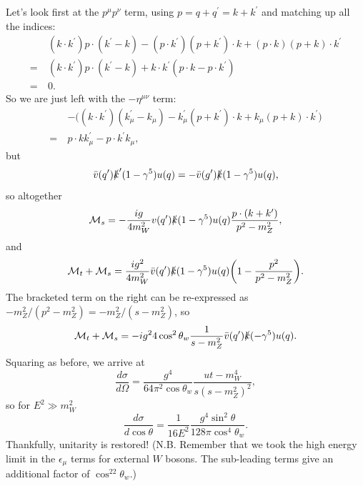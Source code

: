 Let's look first at the $p^\mu p ^\nu$ term, using $p=q+q^\prime = k + k^\prime$ and matching up all the indices:
\begin{equation}
\begin{split}
&(k \cdot k^\prime) p \cdot(k^\prime - k) - (p \cdot k^\prime)(p+k^\prime)\cdot k + (p \cdot k)(p+k) \cdot k^\prime \\
=\ &(k \cdot k^\prime)p\cdot(k^\prime-k) + k\cdot k^\prime (p\cdot k - p \cdot k^\prime) \\
=\ &0.
\end{split}
\end{equation}
So we are just left with the $-\eta^{\mu \nu}$ term:
\begin{equation}
\begin{split}
&- \big( (k \cdot k^\prime)(k^\prime_\mu - k_\mu) - k_\mu^\prime (p+k^\prime)\cdot k + k_\mu (p+k)\cdot k^\prime \big) \\
=\ &p \cdot k k^\prime_\mu - p \cdot k^\prime k_\mu,
\end{split}
\end{equation}
but 
\begin{equation}
\bar{v}(q^\prime)\slashed{k}^\prime(1-\gamma^5)u(q) = -\bar{v}(g^\prime)\slashed{k}(1-\gamma^5)u(q),
\end{equation}
so altogether
\begin{equation}
\mathcal{M}_s = -\frac{ig}{4m_W^2}v(q^\prime)\slashed{k}(1-\gamma^5)u(q) \frac{p \cdot (k + k^\prime)}{p^2-m_Z^2},
\end{equation}
and
\begin{equation}
\begin{split}
\mathcal{M}_t + \mathcal{M}_s = \frac{ig^2}{4m_W^2}\bar{v}(q^\prime)\slashed{k}(1-\gamma^5)u(q)\bigg(1-\frac{p^2}{p^2-m_Z^2}\bigg).
\end{split}
\end{equation}
The bracketed term on the right can be re-expressed as $-m_Z^2/(p^2-m_Z^2) = -m_Z^2/(s-m_Z^2)$, so 
\begin{equation}
\mathcal{M}_t + \mathcal{M}_s = -{ig^2}{4\cos^2\theta_w}\frac{1}{s-m_Z^2}\bar{v}(q^\prime)\slashed{k}(-\gamma^5)u(q).
\end{equation}
Squaring as before, we arrive at
\begin{equation}
\frac{d\sigma}{d\Omega} = \frac{g^4}{64\pi^2\cos\theta_w}\frac{ut-m_W^4}{s(s-m_Z^2)^2},
\end{equation}
so for $E^2 \gg m_W^2$
\begin{equation}
\frac{d\sigma}{d\cos\theta} = \frac{1}{16E^2}\frac{g^4\sin^2\theta}{128\pi\cos^4\theta_w}.
\end{equation}
Thankfully, unitarity is restored! (N.B. Remember that we took the high energy limit in the $\epsilon_\mu$ terms for external $W$ bosons. The sub-leading terms give an additional factor of $\cos^22\theta_w$.) 

